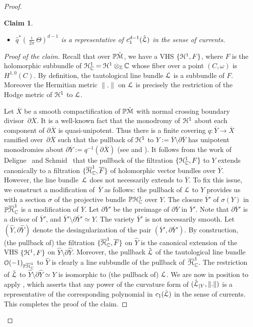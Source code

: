 \documentclass[11pt]{article}
\numberwithin{equation}{section}
\let\mathcal\EuScript
\theoremstyle{plain}
\newtheorem{Claim}[Theorem]{Claim}
\theoremstyle{definition}
\def\C{\mathbb{C}}
\newcommand\Z{\mathbb{Z}}
\newcommand{\Pb}{\mathbb{P}}
\newcommand{\Ocal}{\mathcal{O}}
\newcommand{\cH}{\mathcal{H}}
\newcommand{\cL}{\mathcal{L}}
\newcommand{\cM}{\mathcal{M}}
\let\omg\omega
\let\ol\overline
\begin{document}
\begin{proof}
\begin{Claim}
\begin{itemize}
\item $\hat{q}^*(\frac{\imath}{2\pi}\Theta)^{d-1}$ is a representative of $c^{d-1}_1(\hat{\cL})$ in the sense of currents.
\end{itemize}
\end{Claim}
\begin{proof}[Proof of the claim]
Recall that over $\Pb\hat{\cM}$, we have a VHS $\{\cH^1, F\}$, where $F$ is the holomorphic subbundle of $\cH^1_{\C}=\cH^1\otimes_{\Z}\C$ whose fiber over a point $(C,\omg)$ is $H^{1,0}(C)$. By definition, the tautological line bundle $\cL$ is a subbundle of $F$. Moreover the Hermitian metric $\|.\|$ on $\cL$ is precisely the restriction of the Hodge metric of $\cH^1$ to $\cL$.

Let $\ol{X}$ be a smooth compactification of $\Pb\hat{\cM}$ with normal crossing boundary divi\-sor~$\partial \ol{X}$. It is a well-known fact that the monodromy of $\cH^1$ about each component of $\partial \ol{X}$ is quasi-unipotent. Thus there is a finite covering $q: \ol{Y} \to \ol{X}$ ramified over~$\partial \ol{X}$ such that the pullback of $\cH^1$ to $Y:=\ol{Y}\setminus \partial\ol{Y}$ has unipotent monodromies about $\partial \ol{Y}:=q^{-1}(\partial \ol{X})$ (see \cite[Th.\,17]{Kaw81} and \cite[Lem.\,3.5]{Bru18}). It follows from the work of Deligne~\cite{Del70} and Schmid~\cite{Sch73} that the pullback of the filtration $\{\cH^1_{\C},F\}$ to $Y$ extends canonically to a filtration $\{\ol{\cH}^1_{\C}, \ol{F}\}$ of holomorphic vector bundles over $\ol{Y}$.
However, the line bundle~$\cL$ does not necessarily extends to $\ol{Y}$.
To fix this issue, we construct a modification of~$\ol{Y}$ as follows: the pullback of $\cL$ to $Y$ provides us with a section $\sigma$ of the projective bundle $\Pb\cH^1_{\C}$ over $Y$. The closure $\ol{Y}'$ of $\sigma(Y)$ in $\Pb\ol{\cH}^1_{\C}$ is a modification of $\ol{Y}$. Let $\partial \ol{Y}'$ be the preimage of $\partial \ol{Y}$ in $\ol{Y}'$. Note that $\partial\ol{Y}'$ is a divisor of $\ol{Y}'$, and $\ol{Y}'\setminus\partial\ol{Y}'\simeq Y$. The variety $\ol{Y}'$ is not necessarily smooth. Let $(\hat{Y},\partial\hat{Y})$ denote the desingularization of the pair $(\ol{Y}',\partial \ol{Y}')$. By construction, (the pullback of) the filtration $\{\ol{\cH}^1_{\C}, \ol{F}\}$ on $\hat{Y}$ is the canonical extension of the VHS $\{\cH^1,F\}$ on $\hat{Y}\setminus\partial\hat{Y}$. Moreover, the pullback $\hat{\cL}$ of the tautological line bundle $\Ocal(-1)_{\Pb\ol{\cH}^1_{\C}}$ to $\hat{Y}$ is clearly a line subbundle of the pullback of~$\ol{\cH}^1_{\C}$.
The restriction of $\hat{\cL}$ to $\hat{Y}\setminus\partial\hat{Y}\simeq Y$ is isomorphic to (the pullback of) $\cL$.
We are now in position to apply \cite[Th.\,5.1 and Remark 5.19]{Kollar87}, which asserts that any power of the curvature form of $(\hat{\cL}_{|Y}, \|.\|)$ is a representative of the corresponding polynomial in $c_1(\hat{\cL})$ in the sense of currents. This completes the proof of the claim.
\end{proof}


\end{proof}
\end{document}
